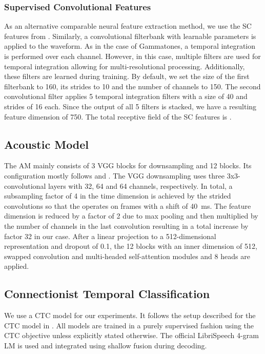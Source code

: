 \documentclass{INTERSPEECH2023}
\begin{document}
\subsubsection{Supervised Convolutional Features}
As an alternative comparable neural feature extraction method, we use the \gls{SC} features from \cite{tuske2018:waveform, vieting2021waveform}.
Similarly, a convolutional filterbank with learnable parameters is applied to the waveform.
As in the case of Gammatones, a temporal integration is performed over each channel.
However, in this case, multiple filters are used for temporal integration allowing for multi-resolutional processing.
Additionally, these filters are learned during training.
By default, we set the size of the first filterbank to 160, its strides to 10 and the number of channels to 150.
The second convolutional filter applies 5 temporal integration filters with a size of 40 and strides of 16 each.
Since the output of all 5 filters is stacked, we have a resulting feature dimension of 750.
The total receptive field of the \gls{SC} features is .

\subsection{Acoustic Model}
The \gls{AM} mainly consists of 3 VGG blocks for downsampling and 12 \conformer blocks.
Its configuration mostly follows \cite{zeineldeen2022conformer} and \cite{zhou2022efficient}.
The VGG downsampling uses three 3x3-convolutional layers with 32, 64 and 64 channels, respectively.
In total, a subsampling factor of 4 in the time dimension is achieved by the strided convolutions so that the \conformer operates on frames with a shift of \SI{40}{\milli\second}.
The feature dimension is reduced by a factor of 2 due to max pooling and then multiplied by the number of channels in the last convolution resulting in a total increase by factor 32 in our case.
After a linear projection to a 512-dimensional representation and dropout of 0.1, the 12 \conformer blocks with an inner dimension of 512, swapped convolution and multi-headed self-attention modules and 8 heads are applied.


\subsection{Connectionist Temporal Classification}
We use a \gls{CTC} model for our experiments.
It follows the setup described for the \gls{CTC} model in \cite{zhou2022efficient}.
All models are trained in a purely supervised fashion using the \gls{CTC} objective unless explicitly stated otherwise.
The official LibriSpeech 4-gram \gls{LM} is used and integrated using shallow fusion \cite{gulcehre2015shallow} during decoding.
\end{document}
